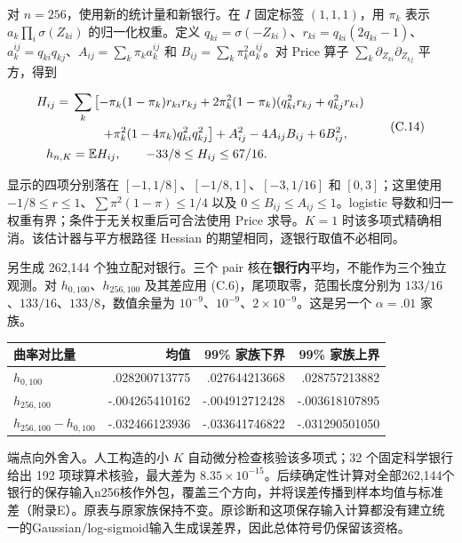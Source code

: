\documentclass[11pt,a4paper]{article}
\begin{document}
对 \(n=256\)，使用新的统计量和新银行。在 \(I\) 固定标签 \((1,1,1)\)，用
\(\pi_k\) 表示 \(a_k\prod_i\sigma(Z_{ki})\) 的归一化权重。定义
\(q_{ki}=\sigma(-Z_{ki})\)、\(r_{ki}=q_{ki}(2q_{ki}-1)\)、\(a_k^{ij}=q_{ki}q_{kj}\)、\(A_{ij}=\sum_k\pi_ka_k^{ij}\)
和 \(B_{ij}=\sum_k\pi_k^2a_k^{ij}\)。对 Price 算子
\(\sum_k\partial_{Z_{ki}}\partial_{Z_{kj}}\) 平方，得到

\[
\begin{aligned}
H_{ij}={}&\sum_k\left[-\pi_k(1-\pi_k)r_{ki}r_{kj}
+2\pi_k^2(1-\pi_k)(q_{ki}^2r_{kj}+q_{kj}^2r_{ki})\right.\\
&\left.\hspace{8mm}+\pi_k^2(1-4\pi_k)q_{ki}^2q_{kj}^2\right]
+A_{ij}^2-4A_{ij}B_{ij}+6B_{ij}^2,\\
h_{n,K}&=\mathbb EH_{ij},\qquad -33/8\le H_{ij}\le67/16.
\end{aligned}
\tag{C.14}
\]

显示的四项分别落在 \([-1,1/8]\)、\([-1/8,1]\)、\([-3,1/16]\) 和
\([0,3]\)；这里使用 \(-1/8\le r\le1\)、\(\sum\pi^2(1-\pi)\le1/4\) 以及
\(0\le B_{ij}\le A_{ij}\le1\)。logistic
导数和归一权重有界；条件于无关权重后可合法使用 Price 求导。\(K=1\)
时该多项式精确相消。该估计器与平方根路径 Hessian
的期望相同，逐银行取值不必相同。

另生成 262,144 个独立配对银行。三个 pair
核在\textbf{银行内}平均，不能作为三个独立观测。对
\(h_{0,100}\)、\(h_{256,100}\) 及其差应用
(C.6)，尾项取零，范围长度分别为
\(133/16\)、\(133/16\)、\(133/8\)，数值余量为
\(10^{-9}\)、\(10^{-9}\)、\(2\times10^{-9}\)。这是另一个 \(\alpha=.01\)
家族。

\begin{longtable}[]{@{}lrrr@{}}
\toprule\noalign{}
曲率对比量 & 均值 & 99\% 家族下界 & 99\% 家族上界 \\
\midrule\noalign{}
\endhead
\bottomrule\noalign{}
\endlastfoot
\(h_{0,100}\) & .028200713775 & .027644213668 & .028757213882 \\
\(h_{256,100}\) & -.004265410162 & -.004912712428 & -.003618107895 \\
\(h_{256,100}-h_{0,100}\) & -.032466123936 & -.033641746822 &
-.031290501050 \\
\end{longtable}

端点向外舍入。人工构造的小 \(K\) 自动微分检查核验该多项式；32
个固定科学银行给出 192 项球算术核验，最大差为
\(8.35\times10^{-15}\)。后续确定性计算对全部262,144个银行的保存输入n256核作外包，覆盖三个方向，并将误差传播到样本均值与标准差（附录E）。原表与原家族保持不变。原诊断和这项保存输入计算都没有建立统一的Gaussian/log-sigmoid输入生成误差界，因此总体符号仍保留该资格。
\end{document}
